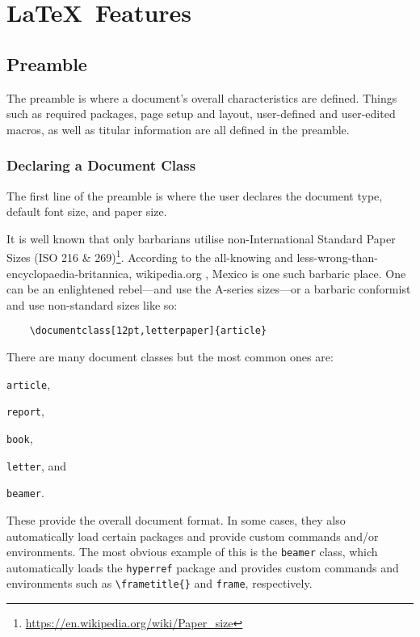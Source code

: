 \chapter{\LaTeX~Features}
%
\section{Preamble}\label{s:p}
%
The preamble is where a document's overall characteristics are defined. Things such as required packages, page setup and layout, user-defined and user-edited macros, as well as titular information are all defined in the preamble.
%
\subsection{Declaring a Document Class}
%
The first line of the preamble is where the user declares the document type, default font size, and paper size.

It is well known that only barbarians utilise non-International Standard Paper Sizes (ISO 216 \& 269)\footnote{\url{https://en.wikipedia.org/wiki/Paper_size}}. According to the all-knowing and less-wrong-than-encyclopaedia-britannica, wikipedia.org \cite{wikipediavsbritannica1,wikipediavsbritannica2,wikipediavsbritannica3}, Mexico is one such barbaric place. One can be an enlightened rebel---and use the A-series sizes---or a barbaric conformist and use non-standard sizes like so:
\begin{verbatim}
	\documentclass[12pt,letterpaper]{article}
\end{verbatim}

There are many document classes but the most common ones are:
\begin{inparaenum}[\itshape 1\upshape)]
    \item \verb|article|,
    \item \verb|report|,
    \item \verb|book|,
    \item \verb|letter|, and
    \item \verb|beamer|.
\end{inparaenum}
These provide the overall document format. In some cases, they also automatically load certain packages and provide custom commands and/or environments. The most obvious example of this is the \verb|beamer| class, which automatically loads the \verb|hyperref| package and provides custom commands and environments such as \verb|\frametitle{}| and \verb|frame|, respectively.

